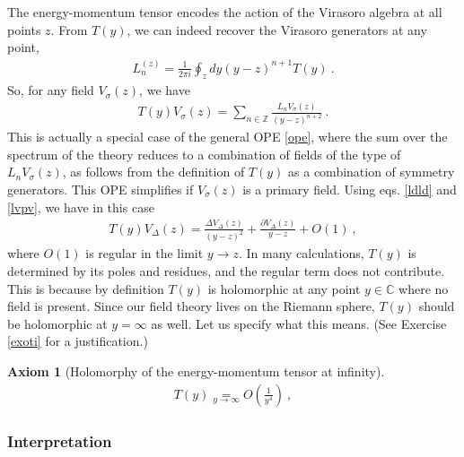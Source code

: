 \documentclass[12pt, a4paper, notitlepage, twoside]{report}
\numberwithin{equation}{section}
\theoremstyle{break}
\newtheorem{hyp}{Axiom}[chapter]
\begin{document}
The energy-momentum tensor encodes the action of the Virasoro algebra at all points $z$. 
From $T(y)$, we can indeed recover the Virasoro generators at any point,
\begin{align}
\boxed{ L_n^{(z)} = \frac{1}{2\pi i}\oint_{z} dy (y-z)^{n+1} T(y)} \ .
\label{lit}
\end{align}
So, for any field $V_\sigma(z)$, we have
\begin{align}
 T(y)V_\sigma(z) = \sum_{n\in{\mathbb{Z}}} \frac{L_n V_\sigma(z)}{(y-z)^{n+2}}\ .
\label{tv}
\end{align}
This is actually a special case of the general OPE \eqref{ope}, where the sum over the spectrum of the theory reduces to a combination of fields of the type of $L_n V_\sigma(z)$, as follows from the definition of $T(y)$ as a combination of symmetry generators.
This OPE simplifies if $V_\sigma(z)$ is a primary field. Using eqs. \eqref{ldld} and \eqref{lvpv}, we have in this case
\begin{align}
 \boxed{T(y) V_\Delta(z) = \frac{\Delta V_\Delta(z)}{(y-z)^2} + \frac{\partial V_\Delta(z)}{y-z} + O(1)}\ ,
\label{tvp}
\end{align}
where $O(1)$ is regular in the limit $y\to z$.
In many calculations, $T(y)$ is determined by its poles and residues, and the regular term does not contribute.
This is because by definition $T(y)$ is holomorphic at any point $y\in\mathbb{C}$ where no field is present.
Since our field theory lives on the Riemann sphere, $T(y)$ should be holomorphic at $y=\infty$ as well. Let us specify what this means. (See Exercise \ref{exoti} for a justification.)

\begin{hyp}[Holomorphy of the energy-momentum tensor at infinity]
 \label{ax:hti}
 \begin{align}
 \boxed{T(y) \underset{y\to \infty}{=} O\left(\frac{1}{y^4}\right)}\ ,
\label{tyi}
\end{align}
\end{hyp} 
\noindent

\subsubsection{Interpretation}
\end{document}
